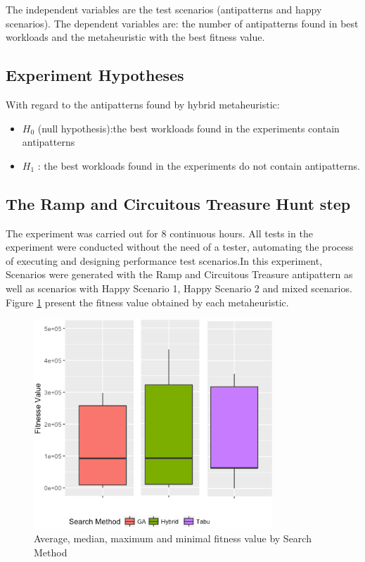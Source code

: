 \documentclass[espaco=umemeio,chapter=TITLE,twoside,openright]{abnt}
\begin{document}
The independent variables are the test scenarios (antipatterns and happy scenarios). The dependent variables are: the number of antipatterns found in best workloads and the metaheuristic with the best fitness value.

\subsection{Experiment Hypotheses}

With regard to the antipatterns found by hybrid metaheuristic:
\begin{itemize}
\item $H_{0}$ (null hypothesis):the best workloads found in the experiments contain antipatterns
\item $H_{1}$ : the best workloads found in the experiments do not contain antipatterns.
\end{itemize}

\subsection{The Ramp and Circuitous Treasure Hunt step}

The experiment was carried out for 8 continuous hours.  All tests in the experiment were conducted without the need of a tester, automating the process of executing and designing performance test scenarios.In this experiment, Scenarios were generated with the Ramp and Circuitous Treasure antipattern as well as scenarios with Happy Scenario 1, Happy Scenario 2 and mixed scenarios. Figure \ref{fig:boxplot1} present the fitness value obtained by each metaheuristic.

\begin{figure}[h]
\centering
\includegraphics[width=0.8\textwidth]{./images/antipattern1.png}
\caption{Average, median, maximum and minimal fitness value by Search Method}
\label{fig:boxplot1}
\end{figure}
\end{document}
